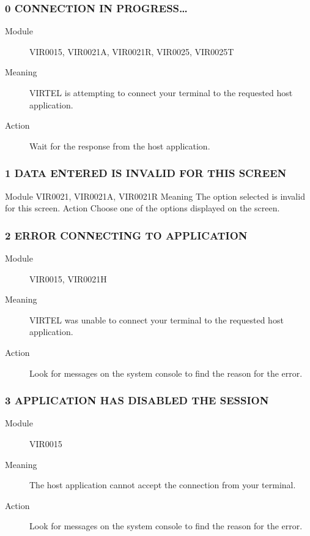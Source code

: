 \documentclass[letterpaper,10pt,english]{sphinxmanual}
\begin{document}
\subsubsection{0 CONNECTION IN PROGRESS…}
\label{\detokenize{messages:connection-in-progress}}\begin{description}
\item[{Module}] \leavevmode
VIR0015, VIR0021A, VIR0021R, VIR0025, VIR0025T

\item[{Meaning}] \leavevmode
VIRTEL is attempting to connect your terminal to the requested host application.

\item[{Action}] \leavevmode
Wait for the response from the host application.

\end{description}


\subsubsection{1 DATA ENTERED IS INVALID FOR THIS SCREEN}
\label{\detokenize{messages:data-entered-is-invalid-for-this-screen}}
Module
VIR0021, VIR0021A, VIR0021R
Meaning
The option selected is invalid for this screen.
Action
Choose one of the options displayed on the screen.


\subsubsection{2 ERROR CONNECTING TO APPLICATION}
\label{\detokenize{messages:error-connecting-to-application}}\begin{description}
\item[{Module}] \leavevmode
VIR0015, VIR0021H

\item[{Meaning}] \leavevmode
VIRTEL was unable to connect your terminal to the requested host application.

\item[{Action}] \leavevmode
Look for messages on the system console to find the reason for the error.

\end{description}


\subsubsection{3 APPLICATION HAS DISABLED THE SESSION}
\label{\detokenize{messages:application-has-disabled-the-session}}\begin{description}
\item[{Module}] \leavevmode
VIR0015

\item[{Meaning}] \leavevmode
The host application cannot accept the connection from your terminal.

\item[{Action}] \leavevmode
Look for messages on the system console to find the reason for the error.

\end{description}
\end{document}
